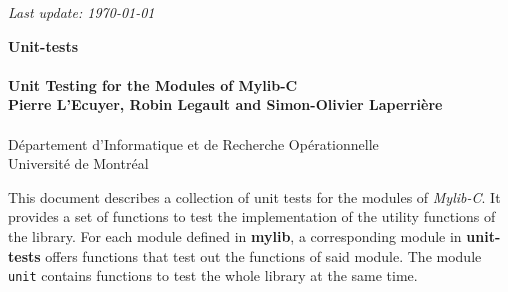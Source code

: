 \begin{titlepage}

\null 
\begin {flushright} \it Last update: \today \end {flushright}

\vfill
\begin{center}
 {\Large\bf Unit-tests} \\ \ \\
 {\large\bf Unit Testing for the Modules of Mylib-C}\\
\vfill
 {\bf Pierre L'Ecuyer, Robin Legault and Simon-Olivier Laperrière} \\ \ \\
\medskip
D\'epartement d'Informatique et de Recherche Op\'erationnelle \\
Universit\'e de Montr\'eal \\
\end{center}
\vfill

This document describes a collection of unit tests for the modules of \emph{Mylib-C}. It provides
a set of functions to test the implementation of the utility functions of the library.
For each module defined in {\bf mylib}, a corresponding module in {\bf unit-tests} offers functions that test out the functions of said module. The module {\tt unit} contains functions to test the whole library at the same time.

\vfill
\end{titlepage}